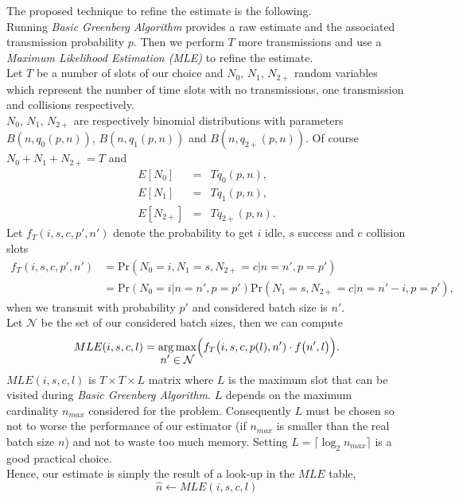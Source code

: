 \documentclass[12pt,a4paper]{report}
\DeclareMathOperator*{\argmax}{arg\,max}
\begin{document}
 The proposed technique to refine the estimate is the following.\\
 Running \emph{Basic Greenberg Algorithm} provides a raw estimate and the associated transmission probability $p$. Then we perform $T$ more transmissions and use a \emph{Maximum Likelihood Estimation (MLE)} to refine the estimate.\\ 
 
 Let $T$ be a number of slots of our choice and $N_{0}$, $N_{1}$, $N_{2+}$ random variables which represent the number of time slots with no transmissions, one transmission and collisions respectively.\\
 $N_{0}$, $N_{1}$, $N_{2+}$ are respectively binomial distributions with parameters $B(n,q_{0}(p,n))$, $B(n,q_{1}(p,n))$ and $B(n,q_{2+}(p,n))$. Of course $N_{0}+N_{1}+N_{2+}=T$ and
 \begin{eqnarray*}
E[N_{0}] &=& Tq_{0}(p,n),\\
E[N_{1}] &=& Tq_{1}(p,n),\\
E[N_{2+}] &=& Tq_{2+}(p,n).
\end{eqnarray*}
Let $f_{T}(i,s,c,p',n')$ denote the probability to get $i$ idle, $s$ success and
 $c$ collision slots \begin{align}
f_{T}(i,s,c,p',n')&= \textrm{Pr}(N_{0}=i,N_{1}=s,N_{2+}=c|n=n',p=p')\\
\nonumber
 &=\textrm{Pr}(N_{0}=i|n=n',p=p')\textrm{Pr}(N_{1}=s,N_{2+}=c|n=n'-i,p=p'),
\end{align}
when we transmit with probability $p'$ and considered batch size is $n'$.\\
Let $\mathcal{N}$ be the set of our considered batch sizes, then we can compute
\begin{equation}
MLE(i,s,c,l)=\argmax_{\displaystyle{n' \in \mathcal{N}}} \Bigl( f_{T}\bigl(i,s,c,p(l),n')\cdot f\bigl(n',l\bigr)\Bigr).
\end{equation}
$MLE(i,s,c,l)$ is $T \times T \times L$ matrix where $L$ is the maximum slot that can be visited during \emph{Basic Greenberg Algorithm}. $L$ depends on the maximum cardinality  $n_{max}$ considered for the problem. Consequently  $L$ must be chosen so not to worse the performance of our estimator (if $n_{max}$ is smaller than the real batch size $n$) and not to waste too much memory. Setting $L= \lceil\log_{2}n_{max}\rceil$ is a good practical choice.\\
Hence, our estimate is simply the result of a look-up in the $MLE$ table,
\begin{equation}
\hat{n} \longleftarrow MLE(i,s,c,l)
\end{equation}
\end{document}
